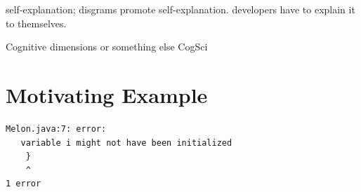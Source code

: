 \documentclass[conference]{IEEEtran}
\begin{document}
self-explanation; disgrams promote self-explanation. developers have to explain it to themselves.

Cognitive dimensions or something else CogSci


\section{Motivating Example}


\newsavebox{\melonlisting}
\begin{lrbox}{\melonlisting}
\begin{lstlisting}[style=JavaError]
Melon.java:7: error: 
   variable i might not have been initialized
    }
    ^
1 error
\end{lstlisting}
\end{lrbox}
\end{document}
